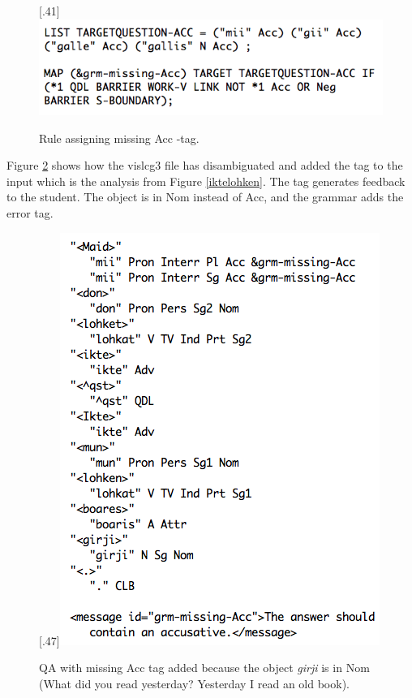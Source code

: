 \documentclass[11pt]{article}
\begin{document}
\begin{figure}[tbp]
\begin{center}
\scalebox{.41}[.41]{\includegraphics{presentation/img/pedcg3ny.png}}
\caption{Rule assigning missing Acc -tag.}
\label{cg3}
\end{center}
\end{figure}

Figure \ref{maidlohket} shows how the vislcg3 file has disambiguated and added the tag to the input which is the analysis from Figure \ref{iktelohken}. The tag generates feedback to the student. The object is in Nom instead of Acc, and the grammar adds the error tag.

\begin{figure}[tbp]
\begin{center}
\scalebox{.47}[.47]{\includegraphics{presentation/img/vasta_feedback2.png}}
\caption{QA with missing Acc tag added because the object \textit{girji} is in Nom (What did you read yesterday? Yesterday I read an old book).}
\label{maidlohket}
\end{center}
\end{figure}
\end{document}
